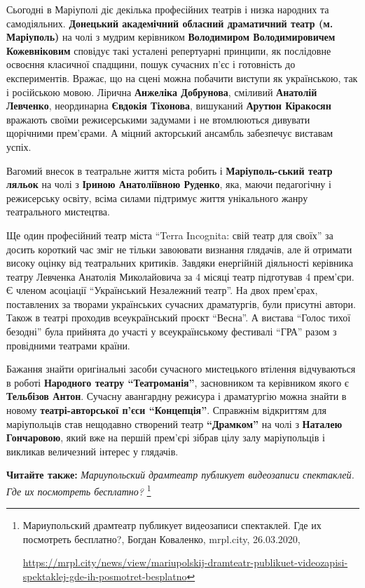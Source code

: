 
Сьогодні в Маріуполі діє декілька професійних театрів і низка народних та
самодіяльних. \textbf{Донецький академічний обласний драматичний театр (м. Маріуполь)}
на чолі з мудрим керівником \textbf{Володимиром Володимировичем Кожевніковим} сповідує
такі усталені репертуарні принципи, як послідовне освоєння класичної спадщини,
пошук сучасних п'єс і готовність до експериментів. Вражає, що на сцені можна
побачити виступи як українською, так і російською мовою. Лірична \textbf{Анжеліка
Добрунова}, сміливий \textbf{Анатолій Левченко}, неординарна \textbf{Євдокія Тіхонова}, вишуканий
\textbf{Арутюн Кіракосян} вражають своїми режисерськими задумами і не втомлюються
дивувати щорічними прем'єрами. А міцний акторський ансамбль забезпечує виставам
успіх.

Вагомий внесок в театральне життя міста робить і \textbf{Маріуполь\hyp{}ський театр ляльок} на
чолі з \textbf{Іриною Анатоліївною Руденко}, яка, маючи педагогічну і режисерську
освіту, всіма силами підтримує життя унікального жанру театрального мистецтва.

Ще один професійний театр міста \enquote{Terra Incognita: свій театр для своїх} за
досить короткий час зміг не тільки завоювати визнання глядачів, але й отримати
високу оцінку від театральних критиків. Завдяки енергійній діяльності керівника
театру Левченка Анатолія Миколайовича за 4 місяці театр підготував 4 прем'єри.
Є членом асоціації \enquote{Український Незалежний театр}. На двох прем'єрах,
поставлених за творами українських сучасних драматургів, були присутні автори.
Також в театрі проходив всеукраїнський проєкт \enquote{Весна}. А вистава \enquote{Голос тихої
безодні} була прийнята до участі у всеукраїнському фестивалі \enquote{ГРА} разом з
провідними театрами країни.

Бажання знайти оригінальні засоби сучасного мистецького втілення відчуваються в
роботі \textbf{Народного театру \enquote{Театроманія}}, засновником та керівником якого є
\textbf{Тельбізов Антон}. Сучасну авангардну режисура і драматургію можна знайти в
новому \textbf{театрі-авторської п'єси \enquote{Концепція}}. Справжнім відкриттям для
маріупольців став нещодавно створений театр \textbf{\enquote{Драмком}} на чолі з \textbf{Наталею
Гончаровою}, який вже на першій прем'єрі зібрав цілу залу маріупольців і
викликав величезний інтерес у глядачів.

\textbf{Читайте также:} \emph{Мариупольский драмтеатр публикует видеозаписи спектаклей. Где их посмотреть бесплатно?}%
\footnote{Мариупольский драмтеатр публикует видеозаписи спектаклей. Где их посмотреть бесплатно?, Богдан Коваленко, %
mrpl.city, 26.03.2020, \par%
\url{https://mrpl.city/news/view/mariupolskij-dramteatr-publikuet-videozapisi-spektaklej-gde-ih-posmotret-besplatno}
}

